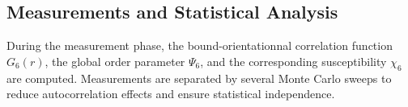 \subsection{Measurements and Statistical Analysis}

During the measurement phase, the bound-orientationnal correlation function $G_6(r)$, the global order parameter $\Psi_6$, and the corresponding susceptibility $\chi_6$ are computed. Measurements are separated by several Monte Carlo sweeps to reduce autocorrelation effects and ensure statistical independence.